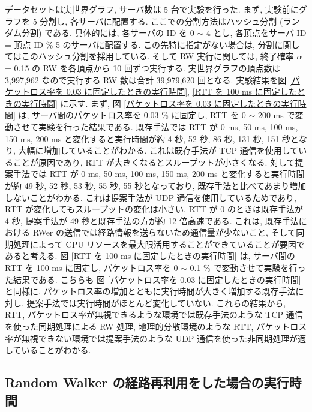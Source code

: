 データセットは実世界グラフ, サーバ数は 5 台で実験を行った. まず, 実験前にグラフを 5 分割し, 各サーバに配置する. ここでの分割方法はハッシュ分割 (ランダム分割) である. 具体的には, 各サーバの ID を 0 $\sim$ 4 とし, 各頂点をサーバ ID = 頂点 ID \% 5 のサーバに配置する. この先特に指定がない場合は, 分割に関してはこのハッシュ分割を採用している. そして RW 実行に関しては, 終了確率 $\alpha$ = 0.15 の RW を各頂点から 10 回ずつ実行する. 実世界グラフの頂点数は 3,997,962 なので実行する RW 数は合計 39,979,620 回となる. 実験結果を図 \ref{パケットロス率を 0.03 に固定したときの実行時間}, \ref{RTT を 100 ms に固定したときの実行時間} に示す. まず, 図 \ref{パケットロス率を 0.03 に固定したときの実行時間} は, サーバ間のパケットロス率を 0.03 \% に固定し, RTT を 0 $\sim$ 200 ms で変動させて実験を行った結果である. 既存手法では RTT が 0 ms, 50 ms, 100 ms, 150 ms, 200 ms と変化すると実行時間が約 4 秒, 52 秒, 86 秒, 131 秒, 151 秒となり, 大幅に増加していることがわかる. これは既存手法が TCP 通信を使用していることが原因であり, RTT が大きくなるとスループットが小さくなる. 対して提案手法では RTT が 0 ms, 50 ms, 100 ms, 150 ms, 200 ms と変化すると実行時間が約 49 秒, 52 秒, 53 秒, 55 秒, 55 秒となっており, 既存手法と比べてあまり増加しないことがわかる. これは提案手法が UDP 通信を使用しているためであり, RTT が変化してもスループットの変化は小さい. RTT が 0 のときは既存手法が 4 秒, 提案手法が 49 秒と既存手法の方が約 12 倍高速である. これは, 既存手法における RWer の送信では経路情報を送らないため通信量が少ないこと, そして同期処理によって CPU リソースを最大限活用することができていることが要因であると考える. 図 \ref{RTT を 100 ms に固定したときの実行時間} は, サーバ間の RTT を 100 ms に固定し, パケットロス率を 0 $\sim$ 0.1 \% で変動させて実験を行った結果である. こちらも 図 \ref{パケットロス率を 0.03 に固定したときの実行時間} と同様に, パケットロス率の増加とともに実行時間が大きく増加する既存手法に対し, 提案手法では実行時間がほとんど変化していない. これらの結果から, RTT, パケットロス率が無視できるような環境では既存手法のような TCP 通信を使った同期処理による RW 処理, 地理的分散環境のような RTT, パケットロス率が無視できない環境では提案手法のような UDP 通信を使った非同期処理が適していることがわかる. 

\subsection{Random Walker の経路再利用をした場合の実行時間}\label{Random Walker の経路再利用をした場合の実行時間}

